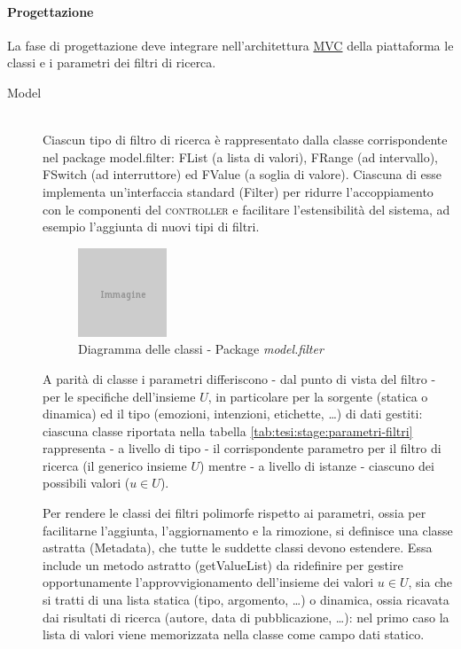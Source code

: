 \paragraph{Progettazione} La fase di progettazione deve integrare nell'architettura \underline{MVC} della piattaforma le classi e i parametri dei filtri di ricerca.
\begin{description}
  \item[Model] \hfill \\
  Ciascun tipo di filtro di ricerca è rappresentato dalla classe corrispondente nel package \textsf{model.filter}: \textsf{FList} (a lista di valori), \textsf{FRange} (ad intervallo), \textsf{FSwitch} (ad interruttore) ed \textsf{FValue} (a soglia di valore). Ciascuna di esse implementa un'interfaccia standard (\textsf{Filter}) per ridurre l'accoppiamento con le componenti del \textsc{controller} e facilitare l'estensibilità del sistema, ad esempio l'aggiunta di nuovi tipi di filtri.

\begin{figure}[ht]
	\begin{center}
		\includegraphics{placeholder.png}
		\caption{Diagramma delle classi - Package \textit{model.filter}}
		\label{fig:tesi:stage:design:model-filter-classi}
	\end{center}
\end{figure}

  A parità di classe i parametri differiscono - dal punto di vista del filtro - per le specifiche dell'insieme $U$, in particolare per la sorgente (statica o dinamica) ed il tipo (emozioni, intenzioni, etichette, \ldots) di dati gestiti: ciascuna classe riportata nella tabella \ref{tab:tesi:stage:parametri-filtri} rappresenta - a livello di tipo - il corrispondente parametro per il filtro di ricerca (il generico insieme $U$) mentre - a livello di istanze - ciascuno dei possibili valori ($u \in U$).

	Per rendere le classi dei filtri polimorfe rispetto ai parametri, ossia per facilitarne l'aggiunta, l'aggiornamento e la rimozione, si definisce una classe astratta (\textsf{Metadata}), che tutte le suddette classi devono estendere. Essa include un metodo astratto (\textsf{getValueList}) da ridefinire per gestire opportunamente l'approvvigionamento dell'insieme dei valori $u \in U$, sia che si tratti di una lista statica (tipo, argomento, \ldots) o dinamica, ossia ricavata dai risultati di ricerca (autore, data di pubblicazione, \ldots): nel primo caso la lista di valori viene memorizzata nella classe come campo dati statico.


\end{description}
